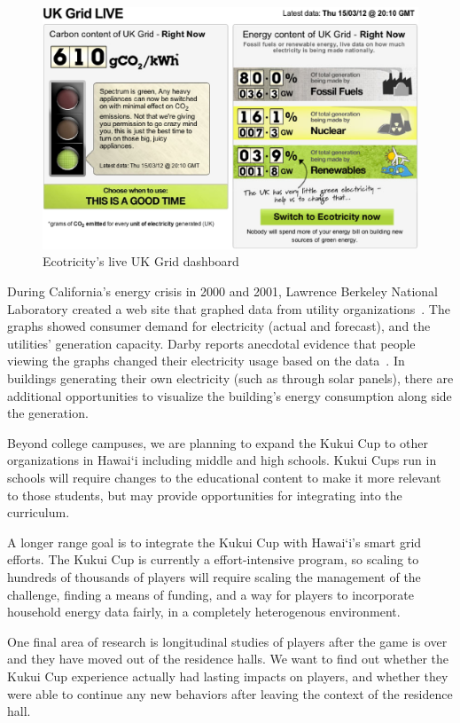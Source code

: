 \documentclass[10pt, conference, compsocconf]{IEEEtran-old}
\newcommand{\Hawaii}{Hawai`i\xspace}
\begin{document}
\begin{figure}[!tb]
	\centering
		\includegraphics[width=\columnwidth]{ecotricity-dashboard}
		\caption{Ecotricity's live UK Grid dashboard}
		\label{fig:ecotricity-dashboard}
\end{figure}

During California's energy crisis in 2000 and 2001, Lawrence Berkeley National Laboratory created a web site that graphed data from utility organizations~\cite{Bartholomew2008Current-Energy}. The graphs showed consumer demand for electricity (actual and forecast), and the utilities' generation capacity. Darby reports anecdotal evidence that people viewing the graphs changed their electricity usage based on the data~\cite{darby-review-2006}. In buildings generating their own electricity (such as through solar panels), there are additional opportunities to visualize the building's energy consumption along side the generation.

Beyond college campuses, we are planning to expand the Kukui Cup to other organizations in \Hawaii including middle and high schools. Kukui Cups run in schools will require changes to the educational content to make it more relevant to those students, but may provide opportunities for integrating into the curriculum.

A longer range goal is to integrate the Kukui Cup with \Hawaii's smart grid efforts. The Kukui Cup is currently a effort-intensive program, so scaling to hundreds of thousands of players will require scaling the management of the challenge, finding a means of funding, and a way for players to incorporate household energy data fairly, in a completely heterogenous environment.

One final area of research is longitudinal studies of players after the game is over and they have moved out of the residence halls. We want to find out whether the Kukui Cup experience actually had lasting impacts on players, and whether they were able to continue any new behaviors after leaving the context of the residence hall.
\end{document}
